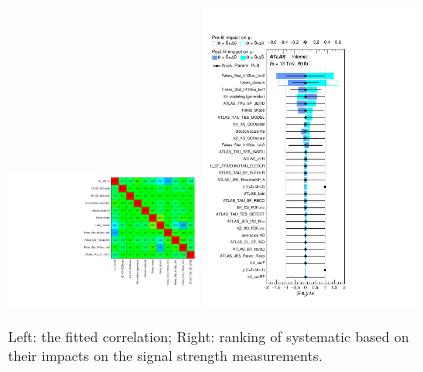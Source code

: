 \begin{figure}[htbp]
\centering
\begin{center}
  \includegraphics[width=0.45\textwidth, keepaspectratio]{fig/OneLepTwoTaus/CorrMatrix.pdf}
  \includegraphics[width=0.5\textwidth, keepaspectratio]{fig/OneLepTwoTaus/Ranking.pdf}
\end{center}
\caption{Left: the fitted correlation; Right: ranking of systematic based on their impacts on the signal strength measurements. 
}
\label{Fig:1l2tau.impacts}
\end{figure}